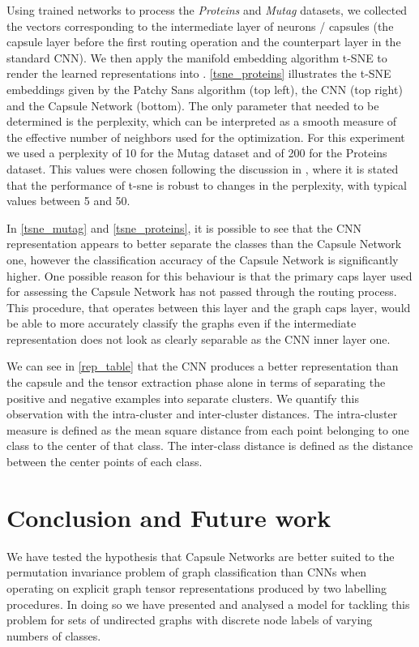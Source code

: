 \documentclass[conference]{IEEEtran}
\begin{document}
Using trained networks to process the \textit{Proteins} and \textit{Mutag} datasets, we collected the vectors corresponding to the intermediate layer of neurons / capsules (the capsule layer before the first routing operation and the counterpart layer in the standard CNN).
We then apply the manifold embedding algorithm t-SNE \cite{maaten2008visualizing} to render the learned representations
into . \autoref{tsne_proteins} illustrates the t-SNE  embeddings given by the Patchy Sans algorithm (top left), the CNN (top right) and the Capsule Network (bottom). 
The only parameter that needed to be determined is the perplexity, which can be interpreted as a smooth measure of the effective number of neighbors used for the optimization. 
For this experiment we used a perplexity of 10 for the Mutag dataset and of 200 for the Proteins dataset. This values were chosen following the discussion in \cite{maaten2008visualizing}, where it is stated that the performance of t-sne is robust to changes in the perplexity, with typical values between 5 and 50.



In \autoref{tsne_mutag} and \autoref{tsne_proteins}, it is possible to see that the CNN representation appears to better separate the classes than the Capsule Network one, however the classification accuracy of the Capsule Network is significantly higher. One possible reason for this behaviour is that the primary caps layer used for assessing the Capsule Network has not passed through the routing process. This procedure, that operates between this layer and the graph caps layer, would be able to more accurately classify the graphs even if the intermediate representation does not look as clearly separable as the CNN inner layer one.

We can see in \autoref{rep_table} that the CNN produces a better representation than the capsule and the tensor extraction phase alone in terms of separating the positive and negative examples into separate clusters. We quantify this observation with the intra-cluster and inter-cluster distances. The intra-cluster measure is defined as the mean square distance from each point belonging to one class to the center of that class. The inter-class distance is defined as the distance between the center points of each class.



\section{Conclusion and Future work}
We have tested the hypothesis that Capsule Networks are better suited to the permutation invariance problem of graph classification than CNNs when operating on explicit graph tensor representations produced by two labelling procedures. In doing so we have presented and analysed a model for tackling this problem for sets of undirected graphs with discrete node labels of varying numbers of classes.
\end{document}
